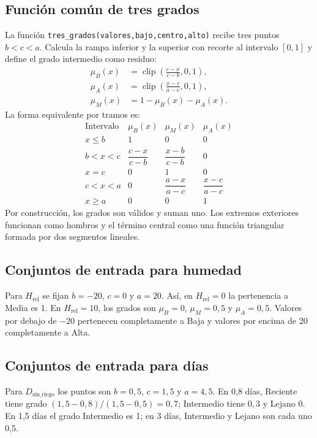 \documentclass[11pt,letterpaper]{article}
\newcommand{\codigo}[1]{\texttt{\small #1}}
\newcommand{\clip}{\operatorname{clip}}
\begin{document}
\subsection{Función común de tres grados}
La función \codigo{tres\_grados(valores,bajo,centro,alto)} recibe tres puntos $b<c<a$. Calcula la rampa inferior y la superior con recorte al intervalo $[0,1]$ y define el grado intermedio como residuo:
\begin{align}
  \mu_B(x)&=\clip\!\left(\frac{c-x}{c-b},0,1\right),\\
  \mu_A(x)&=\clip\!\left(\frac{x-c}{a-c},0,1\right),\\
  \mu_M(x)&=1-\mu_B(x)-\mu_A(x).
  \label{eq:funcion-tres}
\end{align}
La forma equivalente por tramos es:
\begin{equation}
\begin{array}{c|ccc}
\text{Intervalo} & \mu_B(x)&\mu_M(x)&\mu_A(x)\\ \hline
x\leq b &1&0&0\\
b<x<c &\dfrac{c-x}{c-b}&\dfrac{x-b}{c-b}&0\\
x=c &0&1&0\\
c<x<a &0&\dfrac{a-x}{a-c}&\dfrac{x-c}{a-c}\\
x\geq a&0&0&1
\end{array}
\label{eq:tabla-funcion}
\end{equation}
Por construcción, los grados son válidos y suman uno. Los extremos exteriores funcionan como hombros y el término central como una función triangular formada por dos segmentos lineales.

\subsection{Conjuntos de entrada para humedad}
Para $H_{\mathrm{rel}}$ se fijan $b=-20$, $c=0$ y $a=20$. Así, en $H_{\mathrm{rel}}=0$ la pertenencia a Media es 1. En $H_{\mathrm{rel}}=10$, los grados son $\mu_B=0$, $\mu_M=0{,}5$ y $\mu_A=0{,}5$. Valores por debajo de $-20$ pertenecen completamente a Baja y valores por encima de 20 completamente a Alta.

\subsection{Conjuntos de entrada para días}
Para $D_{\mathrm{sin\_riego}}$ los puntos son $b=0{,}5$, $c=1{,}5$ y $a=4{,}5$. En 0,8 días, Reciente tiene grado $(1{,}5-0{,}8)/(1{,}5-0{,}5)=0{,}7$; Intermedio tiene $0{,}3$ y Lejano 0. En 1,5 días el grado Intermedio es 1; en 3 días, Intermedio y Lejano son cada uno 0,5.
\end{document}
